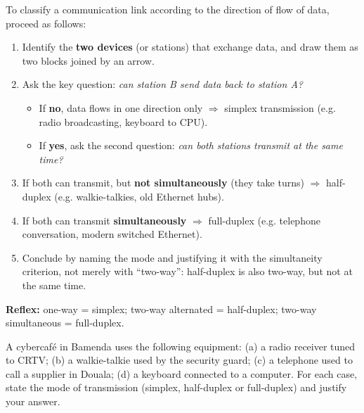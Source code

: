 \documentclass[11pt]{article}
\newcommand{\cle}[1]{{\popxbold\color{popdark}#1}}
\begin{document}
\begin{methode}
To classify a communication link according to the \cle{direction of flow} of data, proceed as follows:
\begin{enumerate}
\item Identify the \textbf{two devices} (or stations) that exchange data, and draw them as two blocks joined by an arrow.
\item Ask the key question: \emph{can station B send data back to station A?}
\begin{itemize}
\item If \textbf{no}, data flows in one direction only $\Rightarrow$ \cle{simplex} transmission (e.g. radio broadcasting, keyboard to CPU).
\item If \textbf{yes}, ask the second question: \emph{can both stations transmit at the same time?}
\end{itemize}
\item If both can transmit, but \textbf{not simultaneously} (they take turns) $\Rightarrow$ \cle{half-duplex} (e.g. walkie-talkies, old Ethernet hubs).
\item If both can transmit \textbf{simultaneously} $\Rightarrow$ \cle{full-duplex} (e.g. telephone conversation, modern switched Ethernet).
\item Conclude by naming the mode and justifying it with the simultaneity criterion, not merely with ``two-way'': half-duplex is also two-way, but not at the same time.
\end{enumerate}
\textbf{Reflex:} one-way = simplex; two-way alternated = half-duplex; two-way simultaneous = full-duplex.
\end{methode}

\begin{experience}
A cybercaf\'e in Bamenda uses the following equipment: (a) a radio receiver tuned to CRTV; (b) a walkie-talkie used by the security guard; (c) a telephone used to call a supplier in Douala; (d) a keyboard connected to a computer. For each case, state the mode of transmission (simplex, half-duplex or full-duplex) and justify your answer.
\end{experience}
\end{document}
